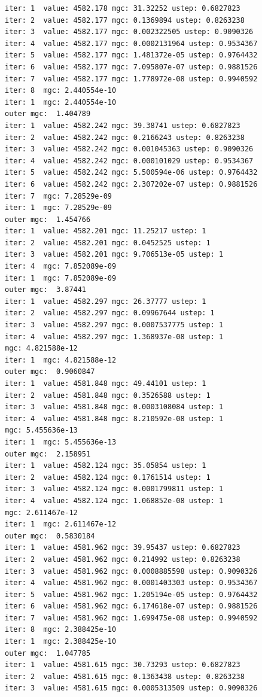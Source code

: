 \documentclass[
  letterpaper,
  DIV=11,
  numbers=noendperiod]{scrartcl}
\begin{document}
\begin{verbatim}
iter: 1  value: 4582.178 mgc: 31.32252 ustep: 0.6827823 
iter: 2  value: 4582.177 mgc: 0.1369894 ustep: 0.8263238 
iter: 3  value: 4582.177 mgc: 0.002322505 ustep: 0.9090326 
iter: 4  value: 4582.177 mgc: 0.0002131964 ustep: 0.9534367 
iter: 5  value: 4582.177 mgc: 1.481372e-05 ustep: 0.9764432 
iter: 6  value: 4582.177 mgc: 7.095807e-07 ustep: 0.9881526 
iter: 7  value: 4582.177 mgc: 1.778972e-08 ustep: 0.9940592 
iter: 8  mgc: 2.440554e-10 
iter: 1  mgc: 2.440554e-10 
outer mgc:  1.404789 
iter: 1  value: 4582.242 mgc: 39.38741 ustep: 0.6827823 
iter: 2  value: 4582.242 mgc: 0.2166243 ustep: 0.8263238 
iter: 3  value: 4582.242 mgc: 0.001045363 ustep: 0.9090326 
iter: 4  value: 4582.242 mgc: 0.000101029 ustep: 0.9534367 
iter: 5  value: 4582.242 mgc: 5.500594e-06 ustep: 0.9764432 
iter: 6  value: 4582.242 mgc: 2.307202e-07 ustep: 0.9881526 
iter: 7  mgc: 7.28529e-09 
iter: 1  mgc: 7.28529e-09 
outer mgc:  1.454766 
iter: 1  value: 4582.201 mgc: 11.25217 ustep: 1 
iter: 2  value: 4582.201 mgc: 0.0452525 ustep: 1 
iter: 3  value: 4582.201 mgc: 9.706513e-05 ustep: 1 
iter: 4  mgc: 7.852089e-09 
iter: 1  mgc: 7.852089e-09 
outer mgc:  3.87441 
iter: 1  value: 4582.297 mgc: 26.37777 ustep: 1 
iter: 2  value: 4582.297 mgc: 0.09967644 ustep: 1 
iter: 3  value: 4582.297 mgc: 0.0007537775 ustep: 1 
iter: 4  value: 4582.297 mgc: 1.368937e-08 ustep: 1 
mgc: 4.821588e-12 
iter: 1  mgc: 4.821588e-12 
outer mgc:  0.9060847 
iter: 1  value: 4581.848 mgc: 49.44101 ustep: 1 
iter: 2  value: 4581.848 mgc: 0.3526588 ustep: 1 
iter: 3  value: 4581.848 mgc: 0.0003108084 ustep: 1 
iter: 4  value: 4581.848 mgc: 8.210592e-08 ustep: 1 
mgc: 5.455636e-13 
iter: 1  mgc: 5.455636e-13 
outer mgc:  2.158951 
iter: 1  value: 4582.124 mgc: 35.05854 ustep: 1 
iter: 2  value: 4582.124 mgc: 0.1761514 ustep: 1 
iter: 3  value: 4582.124 mgc: 0.0001799811 ustep: 1 
iter: 4  value: 4582.124 mgc: 1.068852e-08 ustep: 1 
mgc: 2.611467e-12 
iter: 1  mgc: 2.611467e-12 
outer mgc:  0.5830184 
iter: 1  value: 4581.962 mgc: 39.95437 ustep: 0.6827823 
iter: 2  value: 4581.962 mgc: 0.214992 ustep: 0.8263238 
iter: 3  value: 4581.962 mgc: 0.0008885598 ustep: 0.9090326 
iter: 4  value: 4581.962 mgc: 0.0001403303 ustep: 0.9534367 
iter: 5  value: 4581.962 mgc: 1.205194e-05 ustep: 0.9764432 
iter: 6  value: 4581.962 mgc: 6.174618e-07 ustep: 0.9881526 
iter: 7  value: 4581.962 mgc: 1.699475e-08 ustep: 0.9940592 
iter: 8  mgc: 2.388425e-10 
iter: 1  mgc: 2.388425e-10 
outer mgc:  1.047785 
iter: 1  value: 4581.615 mgc: 30.73293 ustep: 0.6827823 
iter: 2  value: 4581.615 mgc: 0.1363438 ustep: 0.8263238 
iter: 3  value: 4581.615 mgc: 0.0005313509 ustep: 0.9090326 

\end{verbatim}
\end{document}
